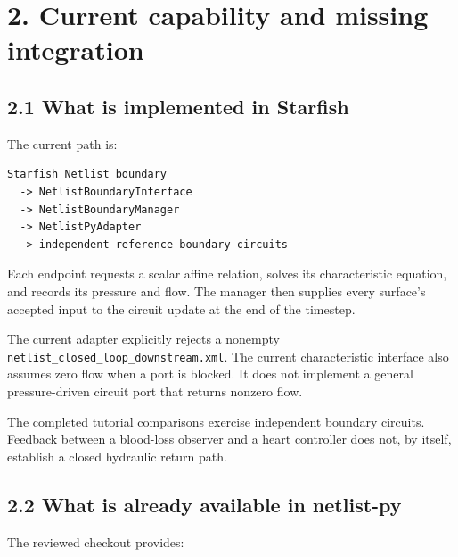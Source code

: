 \documentclass[11pt,a4paper]{article}
\begin{document}
\section{2. Current capability and missing integration}
\subsection{2.1 What is implemented in Starfish}
The current path is:


\begin{lstlisting}
Starfish Netlist boundary
  -> NetlistBoundaryInterface
  -> NetlistBoundaryManager
  -> NetlistPyAdapter
  -> independent reference boundary circuits
\end{lstlisting}
Each endpoint requests a scalar affine relation, solves its characteristic equation, and records its pressure and flow. The manager then supplies every surface's accepted input to the circuit update at the end of the timestep.

The current adapter explicitly rejects a nonempty \texttt{netlist\_\allowbreak{}closed\_\allowbreak{}loop\_\allowbreak{}downstream.\allowbreak{}xml}. The current characteristic interface also assumes zero flow when a port is blocked. It does not implement a general pressure-driven circuit port that returns nonzero flow.

The completed tutorial comparisons exercise independent boundary circuits. Feedback between a blood-loss observer and a heart controller does not, by itself, establish a closed hydraulic return path.

\subsection{2.2 What is already available in netlist-py}
The reviewed checkout provides:
\end{document}
